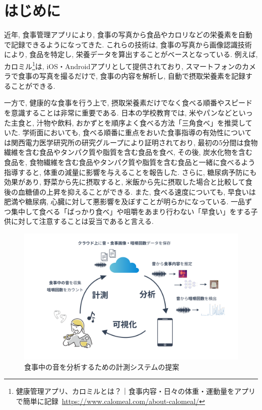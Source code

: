 \chapter{はじめに}
\label{cha:intro}

近年, 食事管理アプリにより, 食事の写真から食品やカロリなどの栄養素を自動で記録できるようになってきた. これらの技術は, 食事の写真から画像認識技術により, 食品を特定し, 栄養データを算出することがベースとなっている. 例えば, カロミル\footnote{健康管理アプリ、カロミルとは？｜食事内容・日々の体重・運動量をアプリで簡単に記録~\url{https://www.calomeal.com/about-calomeal/}}は, iOS・Androidアプリとして提供されており, スマートフォンのカメラで食事の写真を撮るだけで, 食事の内容を解析し, 自動で摂取栄養素を記録することができる.

一方で, 健康的な食事を行う上で, 摂取栄養素だけでなく食べる順番やスピードを意識することは非常に重要である. 日本の学校教育では, 米やパンなどといった主食と, 汁物や飲料, おかずとを順序よく食べる方法「三角食べ」を推奨していた. 学術面においても, 食べる順番に重点をおいた食事指導の有効性については関西電力医学研究所の研究グループにより証明されており, 最初の5分間は食物繊維を含む食品やタンパク質や脂質を含む食品を食べ, その後, 炭水化物を含む食品を, 食物繊維を含む食品やタンパク質や脂質を含む食品と一緒に食べるよう指導すると, 体重の減量に影響を与えることを報告した\cite{yabe2019107450}. さらに, 糖尿病予防にも効果があり, 野菜から先に摂取すると, 米飯から先に摂取した場合と比較して食後の血糖値の上昇を抑えることができる\cite{tonyobyo53112}. また, 食べる速度についても, 早食いは肥満や糖尿病, 心臓に対して悪影響を及ぼすことが明らかになっている\cite{20249}\cite{beyond_willpower}. 一品ずつ集中して食べる「ばっかり食べ」や咀嚼をあまり行わない「早食い」をする子供に対して注意することは妥当であると言える.

\begin{figure}[t]
    \begin{center}
        \includegraphics[clip,  width=1.0\hsize]{img/system.png}
        \caption{食事中の音を分析するための計測システムの提案}
        \label{fig:system}
    \end{center}
\end{figure}

